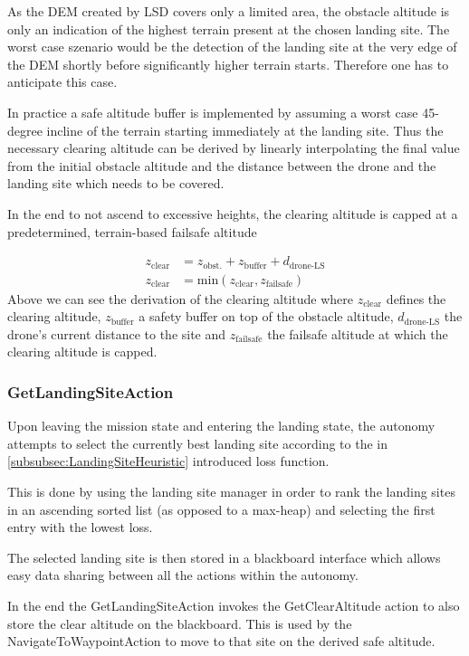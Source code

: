 As the DEM created by LSD covers only a limited area, the obstacle altitude is only an indication of the highest terrain present at the chosen landing site. The worst case szenario would be the detection of the landing site at the very edge of the DEM shortly before significantly higher terrain starts. Therefore one has to anticipate this case. 

In practice a safe altitude buffer is implemented by assuming a worst case 45-degree incline of the terrain starting immediately at the landing site. Thus the necessary clearing altitude can be derived by linearly interpolating the final value from the initial obstacle altitude and the distance between the drone and the landing site which needs to be covered.

In the end to not ascend to excessive heights, the clearing altitude is capped at a predetermined, terrain-based failsafe altitude

\begin{align}
    z_{\text{clear}} &= z_{\text{obst.}} + z_{\text{buffer}} + d_{\text{drone-LS}}\\
    z_{\text{clear}} &= \text{min}\left(z_{\text{clear}}, z_{\text{failsafe}}\right)
\end{align}
Above we can see the derivation of the clearing altitude where $z_{\text{clear}}$ defines the clearing altitude, $z_{\text{buffer}}$ a safety buffer on top of the obstacle altitude, $d_{\text{drone-LS}}$ the drone's current distance to the site and $z_{\text{failsafe}}$ the failsafe altitude at which the clearing altitude is capped.


\subsubsection{GetLandingSiteAction}

Upon leaving the mission state and entering the landing state, the autonomy attempts to select the currently best landing site according to the in \cref{subsubsec:LandingSiteHeuristic} introduced loss function.

This is done by using the landing site manager in order to rank the landing sites in an ascending sorted list (as opposed to a max-heap) and selecting the first entry with the lowest loss.

The selected landing site is then stored in a blackboard interface which allows easy data sharing between all the actions within the autonomy.

In the end the GetLandingSiteAction invokes the GetClearAltitude action to also store the clear altitude on the blackboard. This is used by the NavigateToWaypointAction to move to that site on the derived safe altitude.

